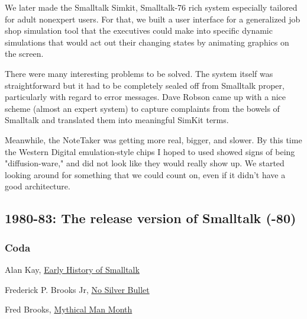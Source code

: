 \documentclass[letterpaper,12pt,parskip=full]{article}
\begin{document}
We later made the Smalltalk Simkit, Smalltalk-76 rich system especially tailored for adult nonexpert users. For that, we built a user interface for a generalized job shop simulation tool that the executives could make into specific dynamic simulations that would act out their changing states by animating graphics on the screen.

There were many interesting problems to be solved. The system itself was straightforward but it had to be completely sealed off from Smalltalk proper, particularly with regard to error messages. Dave Robson came up with a nice scheme (almost an expert system) to capture complaints from the bowels of Smalltalk and translated them into meaningful SimKit terms.

Meanwhile, the NoteTaker was getting more real, bigger, and slower. By this time the Western Digital emulation-style chips I hoped to used showed signs of being "diffusion-ware," and did not look like they would really show up. We started looking around for something that we could count on, even if it didn't have a good architecture.

\subsection{1980-83: The release version of Smalltalk (-80)}
\subsubsection{Coda}

\begin{thebibliography}{99}

Alan Kay, \href{http://worrydream.com/EarlyHistoryOfSmalltalk}{Early History of Smalltalk}

Frederick P. Brooks Jr, \href{http://worrydream.com/refs/Brooks-NoSilverBullet.pdf}{No Silver Bullet}

Fred Brooks, \href{https://www.cs.drexel.edu/~yfcai/CS451/RequiredReadings/MythicalManMonth.pdf}{Mythical Man Month}

\end{thebibliography}
\end{document}
